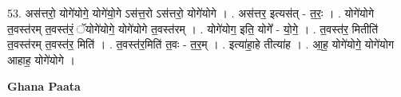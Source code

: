 \documentclass[17pt]{extarticle}
\begin{document}
53. अस॑त्तरो॒ योगे॑योगे॒ योगे॑यो॒गे ऽस॑त्त॒रो ऽस॑त्तरो॒ योगे॑योगे । . अस॑त्तर॒ इत्यस॑त् - त॒रः॒ । . योगे॑योगे त॒वस्त॑रम् त॒वस्त॑रं॒ ॅयोगे॑योगे॒ योगे॑योगे त॒वस्त॑रम् । . योगे॑योग॒ इति॒ योगे᳚ - यो॒गे॒ । . त॒वस्त॑र॒ मितीति॑ त॒वस्त॑रम् त॒वस्त॑र॒ मिति॑ । . त॒वस्त॑र॒मिति॑ त॒वः - त॒र॒म् । . इत्या॑हा॒हे तीत्या॑ह । . आ॒ह॒ योगे॑योगे॒ योगे॑योग आहाह॒ योगे॑योगे । \newline

\textbf{Ghana Paata } \newline
\end{document}
